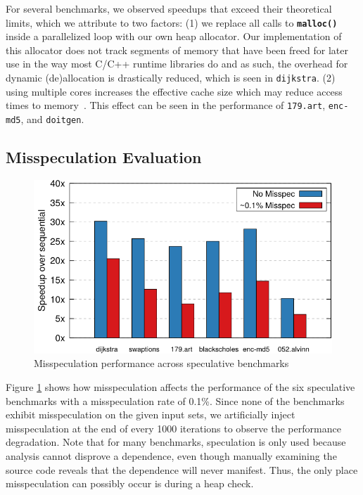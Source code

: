 For several benchmarks, we observed speedups that exceed their theoretical
limits, which we attribute to two factors:
(1) we replace all calls to \texttt{\textbf{malloc()}} inside a parallelized
loop with our own heap allocator. Our implementation of this allocator
does not track segments of memory that have been freed for later use in the
way most C/C++ runtime libraries do and as such, the overhead for dynamic
(de)allocation is drastically reduced, which is seen in \texttt{dijkstra}.
(2) using multiple cores increases the effective cache size which may
reduce access times to memory~\cite{jeon:11:oopsla}. This effect can be
seen in the performance of \texttt{179.art}, \texttt{enc-md5}, and
\texttt{doitgen}.

\subsection{Misspeculation Evaluation}
\begin{figure}[htp]
  \includegraphics[width=\columnwidth]{figures/misspec-crop}
  \caption{Misspeculation performance across speculative benchmarks}
  \label{fig:misspec}
\end{figure}
Figure \ref{fig:misspec} shows how misspeculation affects the
performance of the six speculative benchmarks with a misspeculation rate of
0.1\%. Since none of the benchmarks exhibit misspeculation on the
given input sets, we artificially inject misspeculation at the end of
every 1000 iterations to observe the performance degradation.
Note that for many benchmarks, speculation is only used
because analysis cannot disprove a dependence, even though manually
examining the source code reveals that the dependence will never manifest.
Thus, the only place misspeculation can possibly occur is during a heap
check.
